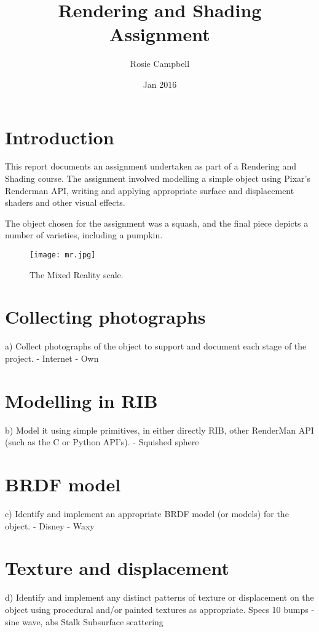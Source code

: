 \documentclass{scrartcl}
\title{Rendering and Shading Assignment}
\date{Jan 2016}
\author{Rosie Campbell}
\begin{document}
\maketitle
{}

\section{Introduction}
This report documents an assignment undertaken as part of a Rendering and Shading course. The assignment involved modelling a simple object using Pixar's Renderman API, writing and applying appropriate surface and displacement shaders and other visual effects.

The object chosen for the assignment was a squash, and the final piece depicts a number of varieties, including a pumpkin.

\begin{figure}[h!]
  \texttt{[image: mr.jpg]}
  \caption{The Mixed Reality scale.}
  \label{fig:mr}
\end{figure}


\section{Collecting photographs}
a) Collect photographs of the object to support and document each stage of the project.
- Internet
- Own



\section{Modelling in RIB}
b) Model it using simple primitives, in either directly RIB, other RenderMan API (such as the C or Python API's).
- Squished sphere

\section{BRDF model}
c) Identify and implement an appropriate BRDF model (or models) for the object.
- Disney
- Waxy

\section{Texture and displacement}
d) Identify and implement any distinct patterns of texture or displacement on the object using procedural and/or painted textures as appropriate.
Specs
10 bumps - sine wave, abs
Stalk
Subsurface scattering
\end{document}
